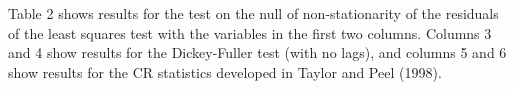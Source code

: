 \documentclass{article}
\begin{document}
\begin{center}
{\small Table 2 shows results for the test on the null of non-stationarity
of the residuals of the least squares test with the variables in the first
two columns. Columns 3 and 4 show results for the Dickey-Fuller test (with
no lags), and columns 5 and 6 show results for the CR statistics developed
in Taylor and Peel (1998).\medskip }
\end{center}
\end{document}
